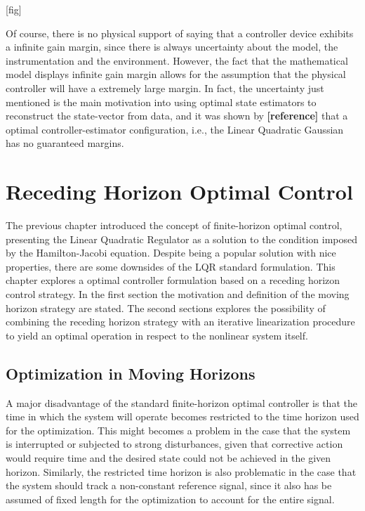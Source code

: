 \documentclass[a4paper,11pt]{book}
\numberwithin{figure}{chapter}
\numberwithin{equation}{chapter}
\numberwithin{table}{chapter}
\theoremstyle{definition}
\begin{document}
[fig]

Of course, there is no physical support of saying that a controller device exhibits a infinite gain margin, since there is always uncertainty about the model, the instrumentation and the environment. However, the fact that the mathematical model displays infinite gain margin allows for the assumption that the physical controller will have a extremely large margin. In fact, the uncertainty just mentioned is the main motivation into using optimal state estimators to reconstruct the state-vector from data, and it was shown by \textbf{[reference]} that a optimal controller-estimator configuration, i.e., the Linear Quadratic Gaussian has no guaranteed margins.

\clearpage
\chapter{Receding Horizon Optimal Control}

The previous chapter introduced the concept of finite-horizon optimal control, presenting the Linear Quadratic Regulator as a solution to the condition imposed by the Hamilton-Jacobi equation. Despite being a popular solution with nice properties, there are some downsides of the LQR standard formulation. This chapter explores a optimal controller formulation based on a receding horizon control strategy. In the first section the motivation and definition of the moving horizon strategy are stated. The second sections explores the possibility of combining the receding horizon strategy with an iterative linearization procedure to yield an optimal operation in respect to the nonlinear system itself.

\section{Optimization in Moving Horizons}

A major disadvantage of the standard finite-horizon optimal controller is that the time in which the system will operate becomes restricted to the time horizon used for the optimization. This might becomes a problem in the case that the system is interrupted or subjected to strong disturbances, given that corrective action would require time and the desired state could not be achieved in the given horizon. Similarly, the restricted time horizon is also problematic in the case that the system should track a non-constant reference signal, since it also has be assumed of fixed length for the optimization to account for the entire signal. 
\end{document}
